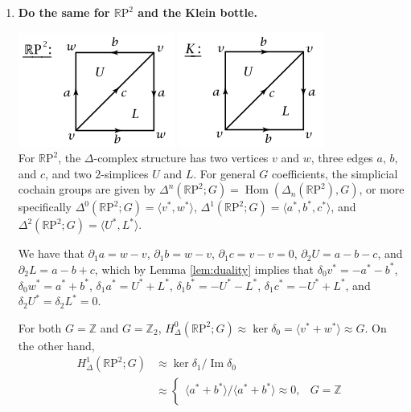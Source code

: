 \documentclass[12pt]{article}
\DeclareMathOperator{\im}{Im}
\DeclareMathOperator{\Hom}{Hom}
\newcommand{\iso}{\approx}
\newcommand{\RP}{\mathbb{R}\mathrm{P}}
\begin{document}
\begin{enumerate}
\begin{enumerate}
            \item
                \boldmath\textbf{Do the same for $\RP^2$ and the Klein bottle.
                }\unboldmath \par
                {\centering
                    \includegraphics[scale=1]{rp2_delta}
                    \includegraphics[scale=1]{klein_delta}
                \\}
                For $\RP^2$, the $\Delta$-complex structure has two vertices $v$ and $w$, three edges $a$, $b$, and $c$, and two $2$-simplices $U$ and $L$. For general $G$ coefficients, the simplicial cochain groups are given by $\Delta^n(\RP^2; G) = \Hom(\Delta_n(\RP^2), G)$, or more specifically $\Delta^0(\RP^2; G) = \langle v^*, w^* \rangle$, $\Delta^1(\RP^2; G) = \langle a^*, b^*, c^* \rangle$, and $\Delta^2(\RP^2; G) = \langle U^*, L^* \rangle$. \par
                We have that $\partial_1 a = w - v$, $\partial_1 b = w - v$, $\partial_1 c = v - v = 0$, $\partial_2 U = a - b - c$, and $\partial_2 L = a - b + c$, which by Lemma \ref{lem:duality} implies that $\delta_0 v^* = -a^* - b^*$, $\delta_0 w^* = a^* + b^*$, $\delta_1 a^* = U^* + L^*$, $\delta_1 b^* = -U^* - L^*$, $\delta_1 c^* = -U^* + L^*$, and $\delta_2 U^* = \delta_2 L^* = 0$. \par
                For both $G = \mathbb{Z}$ and $G = \mathbb{Z}_2$, $H_\Delta^0(\RP^2; G) \iso \ker\delta_0 = \langle v^* + w^* \rangle \iso G$. On the other hand,
                \begin{align*}
                    H_\Delta^1(\RP^2; G) &\iso \ker\delta_1 / \im\delta_0 \\
                    &\iso \begin{cases}
                        \langle a^* + b^* \rangle / \langle a^* + b^* \rangle \iso 0, &G = \mathbb{Z} \\

\end{cases}
\end{align*}
\end{enumerate}
\end{enumerate}
\end{document}
